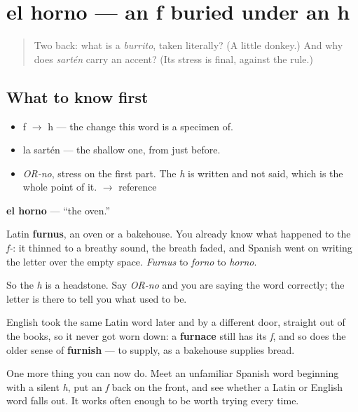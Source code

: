 \section[el horno]{el horno — an f buried under an h}

\label{lesson:ES-C297-horno}



\begin{quote}
Two back: what is a \emph{burrito}, taken literally? (A little donkey.) And why does \emph{sartén} carry an accent? (Its stress is final, against the rule.)
\end{quote}

\subsection*{What to know first}
\begin{itemize}
\raggedright
  \item f $\to$ h — the change this word is a specimen of.
  \item la sartén — the shallow one, from just before.
\end{itemize}

\begin{sounds}
\begin{itemize}
\raggedright
  \item \emph{OR-no}, stress on the first part. The \emph{h} is written and not said, which is the whole point of it. $\to$ reference
\end{itemize}
\end{sounds}

\begin{cousinweb}
\textbf{el horno} — \textquotedblleft{}the oven.\textquotedblright{}

Latin \textbf{furnus}, an oven or a bakehouse. You already know what happened to the \emph{f-}: it thinned to a breathy sound, the breath faded, and Spanish went on writing the letter over the empty space. \emph{Furnus} to \emph{forno} to \emph{horno}.

So the \emph{h} is a headstone. Say \emph{OR-no} and you are saying the word correctly; the letter is there to tell you what used to be.

English took the same Latin word later and by a different door, straight out of the books, so it never got worn down: a \textbf{furnace} still has its \emph{f}, and so does the older sense of \textbf{furnish} — to supply, as a bakehouse supplies bread.

One more thing you can now do. Meet an unfamiliar Spanish word beginning with a silent \emph{h}, put an \emph{f} back on the front, and see whether a Latin or English word falls out. It works often enough to be worth trying every time.
\end{cousinweb}

